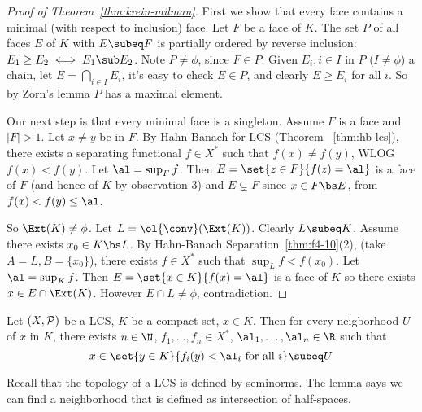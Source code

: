 \begin{proof}[Proof of Theorem~\ref{thm:krein-milman}]
First we show that every face contains a minimal (with respect to inclusion) face. Let $F$ be a face of $K$. The set $P$ of all faces $E$ of $K$ with $E\subeq F$ is partially ordered by reverse inclusion: $E_1\ge E_2\iff E_1\sub E_2$. Note $P\ne \phi$, since $F\in P$. Given $E_i,i\in I$ in $P$ ($I\ne \phi$) a chain, let $E=\bigcap_{i\in I}E_i$, it's easy to check $E\in P$, and clearly $E\ge E_i$ for all $i$. So by Zorn's lemma $P$ has a maximal element.

Our next step is that every minimal face is a singleton. Assume $F$ is a face and $|F|>1$. Let $x\ne y$ be in $F$. By Hahn-Banach for LCS (Theorem ~\ref{thm:hb-lcs}), there exists a separating functional $f\in X^*$ such that $f(x)\ne f(y)$, WLOG $f(x)<f(y)$. Let $\al=\sup_F f$. Then $E=\set{z\in F}{f(z)=\al}$ is a face of $F$ (and hence of $K$ by observation 3) and $E\subsetneq F$ since $x\in F\bs E$, from $f(x)<f(y)\le \al$. 

So $\Ext(K)\ne \phi$. Let $L=\ol{\conv}(\Ext(K))$. Clearly $L\subeq K$. Assume there exists $x_0\in K\bs L$. By Hahn-Banach Separation~\ref{thm:f4-10}(2), (take $A=L,B=\{x_0\}$), there exists $f\in X^*$ such that $\sup_L f<f(x_0)$. Let $\al=\sup_K f$. Then $E=\set{x\in K}{f(x)=\al}$ is a face of $K$ so there exists $x\in E\cap \Ext(K)$. However $E\cap L\ne \phi$, contradiction.
\end{proof}

\begin{lem}
Let $(X,\cal P)$ be a LCS, $K$ be a compact set, $x\in K$. Then for every neigborhood $U$ of $x$ in $K$, there exists $n\in \N$, $f_1,\ldots, f_n\in X^*$, $\al_1,\ldots, \al_n\in \R$ such that 
\[
x\in\set{y\in K}{f_i(y)<\al_i\text{ for all }i}\subeq U
\]
%
\end{lem} 
Recall that the topology of a LCS is defined by seminorms. The lemma says we can find a neighborhood that is defined as intersection of half-spaces.

